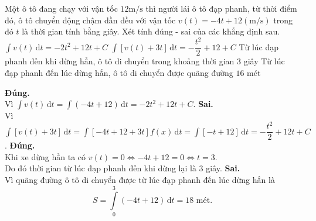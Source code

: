 \begin{ex}%
	Một ô tô đang chạy với vận tốc $12\mathrm{m/s}$ thì người lái ô tô đạp phanh, từ thời điểm đó, ô tô chuyển động chậm dần đều với vận tốc $v(t)=-4t+12 (\mathrm{m/s})$ trong đó $t$ là thời gian tính bằng giây. Xét tính đúng - sai của các khẳng định sau.
	\choiceTF
	{\True $\displaystyle\int v(t)\mathrm{\,d}t=-2t^2+12t+C$}
	{$\displaystyle\int \left[ v(t)+3t\right] \mathrm{\,d}t=-\dfrac{t^2}{2}+12+C$}
	{\True Từ lúc đạp phanh đến khi dừng hẳn, ô tô di chuyển trong khoảng thời gian $3$ giây}
	{Từ lúc đạp phanh đến lúc dừng hẳn, ô tô di chuyển được quãng đường $16$ mét}
	\loigiai
	{
		\begin{itemchoice}
			\itemch \textbf{Đúng.} \\
			Vì $\displaystyle\int v(t)\mathrm{\,d}t=\displaystyle\int \left( -4t+12\right) \mathrm{\,d}t=-2t^2+12t+C$.
			\itemch \textbf{Sai.}\\
			Vì $\displaystyle\int \left[ v(t)+3t\right] \mathrm{\,d}t=\displaystyle\int \left[ -4t+12+3t \right]  f(x)\mathrm{\,d}t=\displaystyle\int \left[ -t+12\right] \mathrm{\,d}t=-\dfrac{t^2}{2}+12t+C$.
			\itemch \textbf{Đúng.}\\
			Khi xe dừng hẳn ta có $v(t)=0 \Leftrightarrow -4t+12=0 \Leftrightarrow t=3$.\\
			Do đó thời gian từ lúc đạp phanh đến khi dừng lại là $3$ giây.
			\itemch \textbf{Sai.}\\
			Vì quãng đường ô tô di chuyển được từ lúc đạp phanh đến lúc dừng hẳn là\\
			$$S=\displaystyle\int\limits_0^3 \left( -4t+12\right) \mathrm{\,d}t=18 \text{ mét.}$$ 
		\end{itemchoice}
	}
\end{ex}

